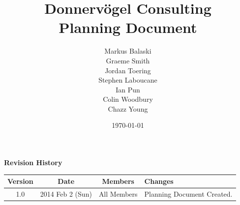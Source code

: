 \documentclass{article}
\begin{document}
\title{Donnervögel Consulting \\ Planning Document}
\author{Markus Balaski \\ Graeme Smith \\ Jordan Toering \\ Stephen Laboucane \\ Ian Pun \\ Colin Woodbury \\ Chazz Young}
\date{\today}
\maketitle
\clearpage

\textbf{Revision History}
\begin{center}
  \begin{tabular}{| c | c | c | l |}
    \hline
    Version & Date & Members & Changes\\
    \hline
    1.0 & 2014 Feb 2 (Sun) & All Members & Planning Document Created.\\
    \hline
  \end{tabular}
\end{center}
\clearpage

\tableofcontents
\clearpage

\end{document}
